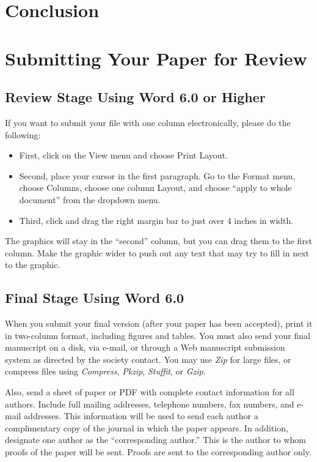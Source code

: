\documentclass[journal]{IEEEtai}
\begin{document}
\section{Conclusion}



\section{Submitting Your Paper for Review}

\subsection{Review Stage Using Word 6.0 or Higher}

If you want to submit your file with one column electronically, please do the following:

\begin{itemize}
\item[--\kern-4pt]First, click on the View menu and choose Print Layout.

\item[--\kern-4pt]Second, place your cursor in the first paragraph. Go to the Format menu, choose Columns, choose one column Layout, and choose ``apply to whole document” from the dropdown menu.

\item[--\kern-4pt]Third, click and drag the right margin bar to just over 4 inches in width.
\end{itemize}

The graphics will stay in the ``second'' column, but you can drag them to the first column. Make the graphic wider to push out any text that may try to fill in next to the graphic.

\subsection{Final Stage Using Word 6.0}

When you submit your final version (after your paper has been accepted), print it in two-column format, including figures and tables. You must also send your final manuscript on a disk, via e-mail, or through a Web manuscript submission system as directed by the society contact. You may use {\it Zip} for large files, or compress files using {\it Compress}, {\it Pkzip}, {\it Stuffit}, or {\it Gzip}. 

Also, send a sheet of paper or PDF with complete contact information for all authors. Include full mailing addresses, telephone numbers, fax numbers, and e-mail addresses. This information will be used to send each author a complimentary copy of the journal in which the paper appears. In addition, designate one author as the ``corresponding author.'' This is the author to whom proofs of the paper will be sent. Proofs are sent to the corresponding author only.
\end{document}
